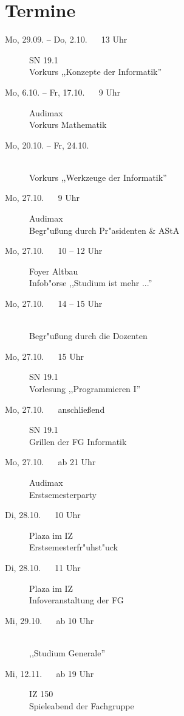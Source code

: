 \section{Termine}

\begin{description}
  \item[Mo, 29.09. -- Do, 2.10. ~~ 13 Uhr] \hfill SN 19.1 \\
  Vorkurs ,,Konzepte der Informatik''
  \item[Mo, 6.10. -- Fr, 17.10. ~~ 9 Uhr] \hfill Audimax \\
  Vorkurs Mathematik
  \item[Mo, 20.10. -- Fr, 24.10.] \ \\
  Vorkurs ,,Werkzeuge der Informatik''
  \item[Mo, 27.10. ~~ 9 Uhr] \hfill Audimax \\
  Begr"u\ss ung durch Pr"asidenten \& AStA
  \item[Mo, 27.10. ~~ 10 -- 12 Uhr] \hfill Foyer Altbau \\
  Infob"orse ,,Studium ist mehr ...''
  \item[Mo, 27.10. ~~ 14 -- 15 Uhr] \ \\
  Begr"u\ss ung durch die Dozenten
  \item[Mo, 27.10. ~~ 15 Uhr] SN 19.1 \\
  Vorlesung ,,Programmieren I''
  \item[Mo, 27.10. ~~ anschließend] SN 19.1 \\
  Grillen der FG Informatik
  \item[Mo, 27.10. ~~ ab 21 Uhr] \hfill Audimax \\
  Erstsemesterparty
  \item[Di, 28.10. ~~ 10 Uhr] \hfill Plaza im IZ \\
  Erstsemesterfr"uhst"uck
  \item[Di, 28.10. ~~ 11 Uhr] \hfill Plaza im IZ \\
  Infoveranstaltung der FG
  \item[Mi, 29.10. ~~ ab 10 Uhr] \ \\
  ,,Studium Generale''
  \item[Mi, 12.11. ~~ ab 19 Uhr] \hfill IZ 150 \\
  Spieleabend der Fachgruppe
\end{description}

